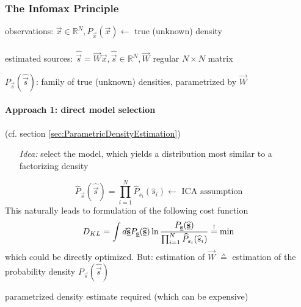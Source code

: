 \subsubsection{The Infomax Principle}
observations: $\vec{x} \in \mathbb{R}^N, P_{\vec{x}}(\vec{x}) \leftarrow$ true (unknown) density 
\\\\
estimated sources: $\widehat{\vec{s}} = \vec{W} \vec{x}, \widehat{\vec{s}} \in \mathbb{R}^N, \vec{W}$ regular $N \times N$ matrix
\begin{itemize}
	\itl $P_{\vec{s}}(\widehat{\vec{s}})$: family of true (unknown) 
		densities, parametrized by $\vec{W}$
\end{itemize}
\paragraph{Approach 1: direct model selection} (cf. section \ref{sec:ParametricDensityEstimation})
\begin{itemize}
\item[\emph{Idea:}]select the model, which yields a distribution most similar to a factorizing density
\end{itemize}
\begin{equation}
	\widehat{P}_{\vec{s}}(\widehat{\vec{s}}) 
	= \prod_{i = 1}^N \widehat{P}_{s_i}(\widehat{s}_i)
	\leftarrow \text{ ICA assumption}
\end{equation}
This naturally leads to formulation of the following cost function
\begin{equation}
	D_{KL} = \int d \widehat{\underline{\mathbf{s}}} P_{\underline{\mathbf{s}}}(\widehat{\underline{\mathbf{s}}})
		\ln \frac{P_{\underline{\mathbf{s}}}(\widehat{\underline{\mathbf{s}}})}{
			\prod_{i = 1}^N \widehat{P}_{s_i}(\widehat{s}_i) }
		\stackrel{\mathrm{!}}{=} \min
\end{equation}
which could be directly optimized. 
But: estimation of $\vec{W} \; \corresponds$ estimation of the probability density $P_{\vec{s}}(\widehat{\vec{s}})$
\begin{itemize}
	\itl parametrized density estimate required (which can be expensive)
\end{itemize}



